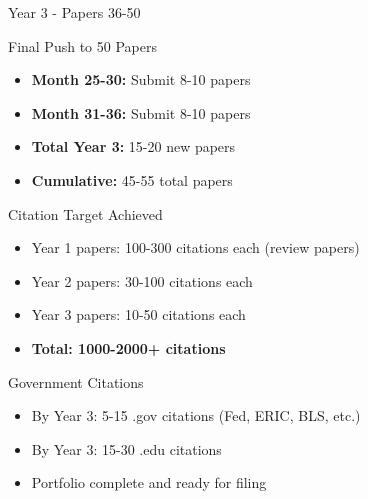 \documentclass[11pt]{beamer}
\begin{document}
	\begin{frame}{Year 3 - Papers 36-50}
		\scriptsize
		\begin{block}{Final Push to 50 Papers}
			\begin{itemize}
				\item \textbf{Month 25-30:} Submit 8-10 papers
				\item \textbf{Month 31-36:} Submit 8-10 papers
				\item \textbf{Total Year 3:} 15-20 new papers
				\item \textbf{Cumulative:} 45-55 total papers
			\end{itemize}
		\end{block}
		\begin{block}{Citation Target Achieved}
			\begin{itemize}
				\item Year 1 papers: 100-300 citations each (review papers)
				\item Year 2 papers: 30-100 citations each
				\item Year 3 papers: 10-50 citations each
				\item \textbf{Total: 1000-2000+ citations}
			\end{itemize}
		\end{block}
		\begin{block}{Government Citations}
			\begin{itemize}
				\item By Year 3: 5-15 .gov citations (Fed, ERIC, BLS, etc.)
				\item By Year 3: 15-30 .edu citations
				\item Portfolio complete and ready for filing
			\end{itemize}
		\end{block}
	\end{frame}
	
\end{document}
